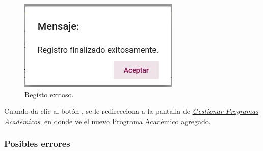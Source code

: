         \begin{figure}[H]
            \centering
            \hypertarget{exito}{\includegraphics[width=0.7\linewidth]{images/SP3/Exitoso}}
            \caption{Registo exitoso.}
            \label{exito}
        \end{figure}

        Cuando da clic al botón , se le redirecciona a la pantalla de \hyperlink{consultarpa}{\textit{Gestionar Programas Académicos}}, en donde ve el nuevo Programa Académico agregado.\\


        \subsubsection{Posibles errores}

